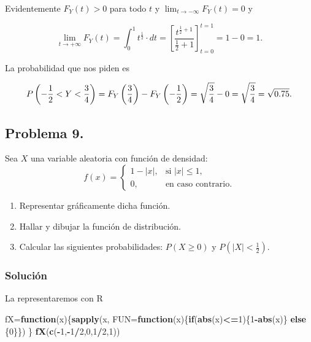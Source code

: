 \documentclass[
]{article}
\newenvironment{Shaded}{\begin{snugshade}}{\end{snugshade}}
\newcommand{\AttributeTok}[1]{\textcolor[rgb]{0.13,0.29,0.53}{#1}}
\newcommand{\ControlFlowTok}[1]{\textcolor[rgb]{0.13,0.29,0.53}{\textbf{#1}}}
\newcommand{\DecValTok}[1]{\textcolor[rgb]{0.00,0.00,0.81}{#1}}
\newcommand{\FunctionTok}[1]{\textcolor[rgb]{0.13,0.29,0.53}{\textbf{#1}}}
\newcommand{\NormalTok}[1]{#1}
\newcommand{\OtherTok}[1]{\textcolor[rgb]{0.56,0.35,0.01}{#1}}
\newcommand{\SpecialCharTok}[1]{\textcolor[rgb]{0.81,0.36,0.00}{\textbf{#1}}}
\providecommand{\tightlist}{%
  \setlength{\itemsep}{0pt}\setlength{\parskip}{0pt}}
\begin{document}
Evidentemente \(F_Y(t)>0\) para todo \(t\) y
\(\lim_{t\to-\infty} F_Y(t)=0\) y

\[
\lim_{t\to+\infty} F_Y(t)=\int_0^1 t^{\frac12} \cdot dt =
\left[\frac{t^{\frac12+1}}{\frac12+1}\right]_{t=0}^{t=1}=1-0=1.
\]

La probabilidad que nos piden es

\[
P\left(-{1\over 2}<Y<{3\over 4}\right)=F_Y\left({3\over 4}\right)-F_Y\left(-{1\over 2}\right)=\sqrt{\frac34}-0=\sqrt{\frac34}=\sqrt{0.75}.
\]

\subsection{Problema 9.}\label{problema-9.}

Sea \(X\) una variable aleatoria con función de densidad: \[
f(x)=\begin{cases}
1-|x|, & \mbox{si }|x|\leq 1,\\
0, & \mbox{en caso contrario.}
\end{cases}
\]

\begin{enumerate}
\def\labelenumi{\arabic{enumi}.}
\tightlist
\item
  Representar gráficamente dicha función.
\item
  Hallar y dibujar la función de distribución.
\item
  Calcular las siguientes probabilidades: \(P(X\geq 0)\) y
  \(P\left(|X|<\frac{1}{2}\right).\)
\end{enumerate}

\subsubsection{Solución}\label{soluciuxf3n-8}

La representaremos con R

\begin{Shaded}
\begin{Highlighting}[]
\NormalTok{fX}\OtherTok{=}\ControlFlowTok{function}\NormalTok{(x)\{}\FunctionTok{sapply}\NormalTok{(x,}
                      \AttributeTok{FUN=}\ControlFlowTok{function}\NormalTok{(x)\{}\ControlFlowTok{if}\NormalTok{(}\FunctionTok{abs}\NormalTok{(x)}\SpecialCharTok{\textless{}=}\DecValTok{1}\NormalTok{)\{}\DecValTok{1}\SpecialCharTok{{-}}\FunctionTok{abs}\NormalTok{(x)\}}
                        \ControlFlowTok{else}\NormalTok{ \{}\DecValTok{0}\NormalTok{\}\})}
\NormalTok{  \}}
\FunctionTok{fX}\NormalTok{(}\FunctionTok{c}\NormalTok{(}\SpecialCharTok{{-}}\DecValTok{1}\NormalTok{,}\SpecialCharTok{{-}}\DecValTok{1}\SpecialCharTok{/}\DecValTok{2}\NormalTok{,}\DecValTok{0}\NormalTok{,}\DecValTok{1}\SpecialCharTok{/}\DecValTok{2}\NormalTok{,}\DecValTok{1}\NormalTok{))}
\end{Highlighting}
\end{Shaded}
\end{document}
